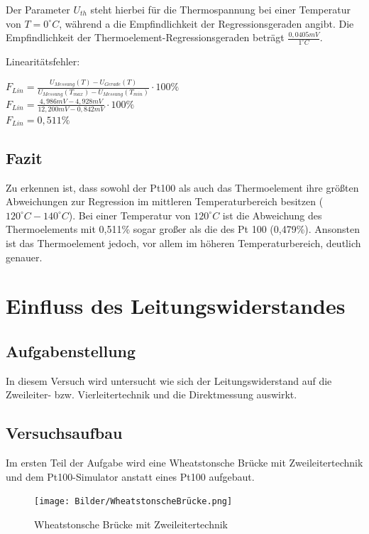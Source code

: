\documentclass[a4paper,11pt,oneside]{article}
\begin{document}
Der Parameter $U_{th}$ steht hierbei für die Thermospannung bei einer Temperatur von $T = 0^\circ C$, während a die Empfindlichkeit der Regressionsgeraden angibt. Die Empfindlichkeit der Thermoelement-Regressionsgeraden beträgt $\frac{0,0405 mV}{1 ^\circ C}$.

\newpage

Linearitätsfehler:

\begin{center}
$F_{Lin} = \frac{U_{Messung}(T) - U_{Gerade}(T)}{U_{Messung}(T_{max}) - U_{Messung}(T_{min})}\cdot 100\%$\\
\vspace{0.5cm}
$F_{Lin} = \frac{4,986mV - 4,928mV}{12,200mV-0,842mV}\cdot 100\%$\\
\vspace{0.5cm}
$F_{Lin} = 0,511\%$
\end{center}

\subsection{Fazit}
Zu erkennen ist, dass sowohl der Pt100 als auch das Thermoelement ihre größten Abweichungen zur Regression im mittleren Temperaturbereich besitzen ($120^\circ C - 140^\circ C$). Bei einer Temperatur von $120^\circ C$ ist die Abweichung des Thermoelements mit 0,511\% sogar großer als die des Pt 100 (0,479\%). Ansonsten ist das Thermoelement jedoch, vor allem im höheren Temperaturbereich, deutlich genauer.
\newpage

\section{Einfluss des Leitungswiderstandes}
\subsection{Aufgabenstellung}
In diesem Versuch wird untersucht wie sich der Leitungswiderstand auf die Zweileiter- bzw. Vierleitertechnik und die Direktmessung auswirkt.
\subsection{Versuchsaufbau}
Im ersten Teil der Aufgabe wird eine Wheatstonsche Brücke mit Zweileitertechnik und dem Pt100-Simulator anstatt eines Pt100 aufgebaut.
\begin{center}
\begin{figure}[h]
\centering
\texttt{[image: Bilder/WheatstonscheBrücke.png]}
\caption{Wheatstonsche  Brücke mit Zweileitertechnik}
\end{figure}
\end{center}
\end{document}
